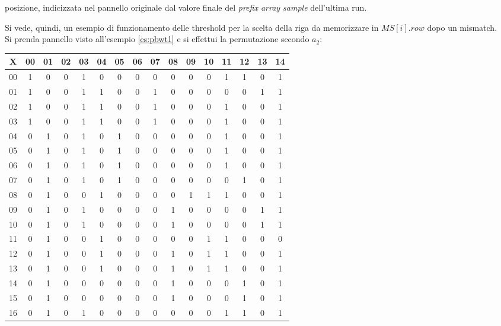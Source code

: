 posizione, indicizzata nel pannello originale dal valore finale del
\textit{prefix array sample} dell'ultima run.
\begin{esempio}
  \label{es:thr}
  Si vede, quindi, un esempio di funzionamento delle threshold per la scelta
  della riga da memorizzare in $MS[i].row$ dopo un mismatch.\\
  Si prenda pannello visto all'esempio \ref{es:pbwt1} e si effettui la
  permutazione secondo $a_2$:
  \begin{table}[H]
    \centering
    \footnotesize
    \begin{tabular}{c|cc|c|cccccccccccc}
      X & 00 & 01 & 02 & 03 & 04 & 05 & 06 & 07 & 08 & 09 & 10 & 11 & 12 & 13
      & 14 \\
      \hline
      00 & 1 & 0 & 0 & 1 & 0 & 0 & 0 & 0 & 0 & 0 & 0 & 1 & 1 & 0 & 1 \\
      01 & 1 & 0 & 0 & 1 & 1 & 0 & 0 & 1 & 0 & 0 & 0 & 0 & 0 & 1 & 1 \\
      02 & 1 & 0 & 0 & 1 & 1 & 0 & 0 & 1 & 0 & 0 & 0 & 1 & 0 & 0 & 1 \\
      03 & 1 & 0 & 0 & 1 & 1 & 0 & 0 & 1 & 0 & 0 & 0 & 1 & 0 & 0 & 1 \\
      04 & 0 & 1 & 0 & 1 & 0 & 1 & 0 & 0 & 0 & 0 & 0 & 1 & 0 & 0 & 1 \\
      05 & 0 & 1 & 0 & 1 & 0 & 1 & 0 & 0 & 0 & 0 & 0 & 1 & 0 & 0 & 1 \\
      06 & 0 & 1 & 0 & 1 & 0 & 1 & 0 & 0 & 0 & 0 & 0 & 1 & 0 & 0 & 1 \\
      07 & 0 & 1 & 0 & 1 & 0 & 1 & 0 & 0 & 0 & 0 & 0 & 0 & 1 & 0 & 1 \\
      08 & 0 & 1 & 0 & 0 & 1 & 0 & 0 & 0 & 0 & 1 & 1 & 1 & 0 & 0 & 1 \\
      09 & 0 & 1 & 0 & 1 & 0 & 0 & 0 & 0 & 1 & 0 & 0 & 0 & 0 & 1 & 1 \\
      10 & 0 & 1 & 0 & 1 & 0 & 0 & 0 & 0 & 1 & 0 & 0 & 0 & 0 & 1 & 1 \\
      11 & 0 & 1 & 0 & 0 & 1 & 0 & 0 & 0 & 0 & 0 & 1 & 1 & 0 & 0 & 0 \\
      12 & 0 & 1 & 0 & 0 & 1 & 0 & 0 & 0 & 1 & 0 & 1 & 1 & 0 & 0 & 1 \\
      13 & 0 & 1 & 0 & 0 & 1 & 0 & 0 & 0 & 1 & 0 & 1 & 1 & 0 & 0 & 1 \\
      14 & 0 & 1 & 0 & 0 & 0 & 0 & 0 & 0 & 1 & 0 & 0 & 0 & 1 & 0 & 1 \\
      15 & 0 & 1 & 0 & 0 & 0 & 0 & 0 & 0 & 1 & 0 & 0 & 0 & 1 & 0 & 1 \\
      16 & 0 & 1 & 0 & 1 & 0 & 0 & 0 & 0 & 0 & 0 & 0 & 1 & 1 & 0 & 1 \\

\end{tabular}
\end{table}
\end{esempio}
